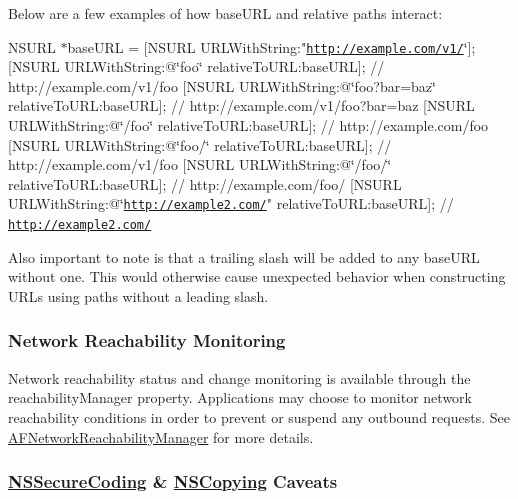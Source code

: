 Below are a few examples of how {\ttfamily base\+U\+R\+L} and relative paths interact\+:

N\+S\+U\+R\+L $\ast$base\+U\+R\+L = \mbox{[}N\+S\+U\+R\+L U\+R\+L\+With\+String\+:"\href{http://example.com/v1/}{\tt http\+://example.\+com/v1/}\char`\"{}\mbox{]};
   \mbox{[}\+N\+S\+U\+R\+L U\+R\+L\+With\+String\+:@\char`\"{}foo\char`\"{} relative\+To\+U\+R\+L\+:base\+U\+R\+L\mbox{]};                  // http\+://example.\+com/v1/foo
   \mbox{[}\+N\+S\+U\+R\+L U\+R\+L\+With\+String\+:@\char`\"{}foo?bar=baz\char`\"{} relative\+To\+U\+R\+L\+:base\+U\+R\+L\mbox{]};          // http\+://example.\+com/v1/foo?bar=baz
   \mbox{[}\+N\+S\+U\+R\+L U\+R\+L\+With\+String\+:@\char`\"{}/foo\char`\"{} relative\+To\+U\+R\+L\+:base\+U\+R\+L\mbox{]};                 // http\+://example.\+com/foo
   \mbox{[}\+N\+S\+U\+R\+L U\+R\+L\+With\+String\+:@\char`\"{}foo/\char`\"{} relative\+To\+U\+R\+L\+:base\+U\+R\+L\mbox{]};                 // http\+://example.\+com/v1/foo
   \mbox{[}\+N\+S\+U\+R\+L U\+R\+L\+With\+String\+:@\char`\"{}/foo/\char`\"{} relative\+To\+U\+R\+L\+:base\+U\+R\+L\mbox{]};                // http\+://example.\+com/foo/
   \mbox{[}\+N\+S\+U\+R\+L U\+R\+L\+With\+String\+:@\char`\"{}\href{http://example2.com/}{\tt http\+://example2.\+com/}" relative\+To\+U\+R\+L\+:base\+U\+R\+L\mbox{]}; // \href{http://example2.com/}{\tt http\+://example2.\+com/}

Also important to note is that a trailing slash will be added to any {\ttfamily base\+U\+R\+L} without one. This would otherwise cause unexpected behavior when constructing U\+R\+Ls using paths without a leading slash.

\subsubsection*{Network Reachability Monitoring}

Network reachability status and change monitoring is available through the {\ttfamily reachability\+Manager} property. Applications may choose to monitor network reachability conditions in order to prevent or suspend any outbound requests. See {\ttfamily \hyperlink{interface_a_f_network_reachability_manager}{A\+F\+Network\+Reachability\+Manager}} for more details.

\subsubsection*{\hyperlink{class_n_s_secure_coding-p}{N\+S\+Secure\+Coding} \& \hyperlink{class_n_s_copying-p}{N\+S\+Copying} Caveats}

